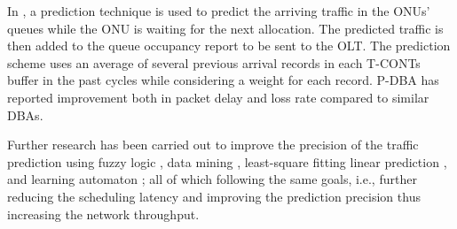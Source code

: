In \cite{6234355}, a prediction technique is used to predict the arriving traffic in the \ac{ONU}s' queues while the \ac{ONU} is waiting for the next allocation. The predicted traffic is then added to the queue occupancy report to be sent to the OLT. The prediction scheme uses an average of several previous arrival records in each \acp{T-CONT} buffer in the past cycles while considering a weight for each record. P-\ac{DBA} has reported improvement both in packet delay and loss rate compared to similar \ac{DBA}s.

Further research has been carried out to improve the precision of the traffic prediction using fuzzy logic \cite{7725428}, data mining \cite{7495169}, least-square fitting linear prediction \cite{Hanaya:18}, and learning automaton \cite{Sarigiannidis2015}; all of which following the same goals, i.e., further reducing the scheduling latency and improving the prediction precision thus increasing the network throughput.








